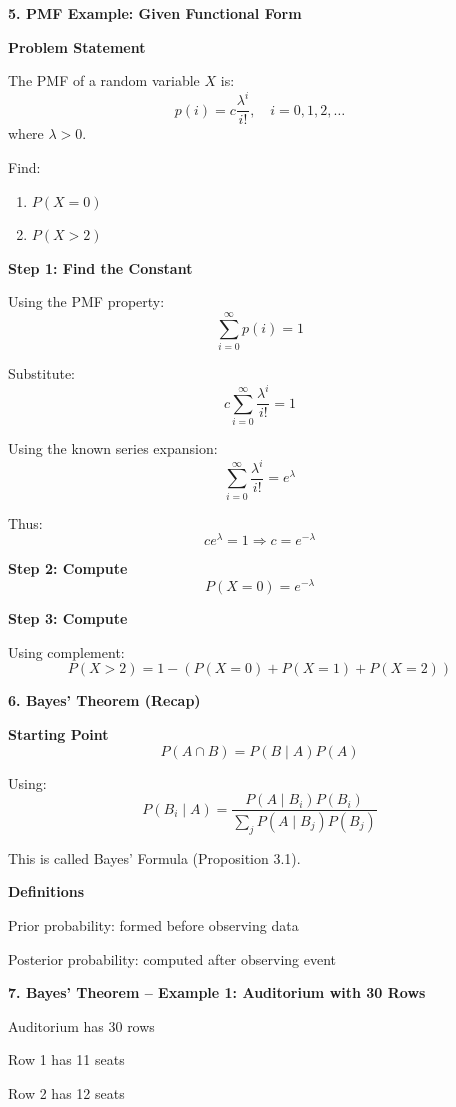\documentclass[12pt]{article}
\begin{document}
\vspace{0.5em}

\textbf{5. PMF Example: Given Functional Form}

\textbf{Problem Statement}

The PMF of a random variable $X$ is:
\[
p(i) = c \frac{\lambda^i}{i!}, \quad i = 0,1,2,\dots
\]
where $\lambda > 0$.

Find:
\begin{enumerate}[leftmargin=2em]
\item $P(X = 0)$
\item $P(X > 2)$
\end{enumerate}

\textbf{Step 1: Find the Constant}

Using the PMF property:
\[
\sum_{i=0}^{\infty} p(i) = 1
\]

Substitute:
\[
c \sum_{i=0}^{\infty} \frac{\lambda^i}{i!} = 1
\]

Using the known series expansion:
\[
\sum_{i=0}^{\infty} \frac{\lambda^i}{i!} = e^{\lambda}
\]

Thus:
\[
c e^{\lambda} = 1 \Rightarrow c = e^{-\lambda}
\]

\textbf{Step 2: Compute}
\[
P(X = 0) = e^{-\lambda}
\]

\textbf{Step 3: Compute}

Using complement:
\[
P(X > 2) = 1 - \left(P(X=0) + P(X=1) + P(X=2)\right)
\]

\vspace{0.5em}

\textbf{6. Bayes’ Theorem (Recap)}

\textbf{Starting Point}
\[
P(A \cap B) = P(B \mid A)P(A)
\]

Using:
\[
P(B_i \mid A) =
\frac{P(A \mid B_i)P(B_i)}
{\sum_j P(A \mid B_j)P(B_j)}
\]

This is called Bayes’ Formula (Proposition 3.1).

\textbf{Definitions}

Prior probability: formed before observing data

Posterior probability: computed after observing event

\vspace{0.5em}

\textbf{7. Bayes’ Theorem – Example 1: Auditorium with 30 Rows}

Auditorium has 30 rows

Row 1 has 11 seats

Row 2 has 12 seats
\end{document}
